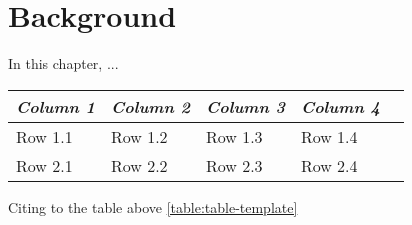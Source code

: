 \chapter{Background}
In this chapter, ...

\begin{center}

  \begin{tabular} {l l l l l}
  \toprule
  \it Column 1 & \it Column 2 & \it Column 3 & \it Column 4 \\
  \midrule

  Row 1.1 & Row 1.2 & Row 1.3 & Row 1.4 \\
  Row 2.1 & Row 2.2 & Row 2.3 & Row 2.4 \\  
          
  \bottomrule
  \end{tabular}

\end{center}

Citing to the table above \ref{table:table-template}